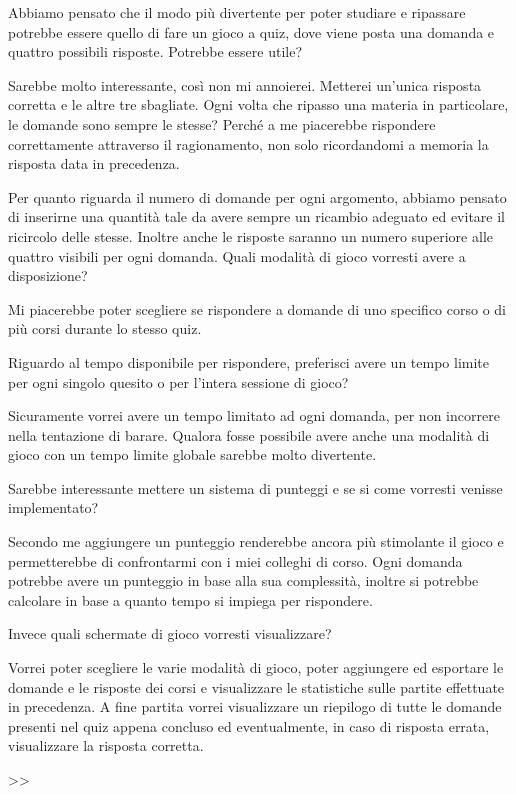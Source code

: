 {    \begin{QandA}
        \item Abbiamo pensato che il modo più divertente per poter studiare e ripassare potrebbe essere quello di fare un gioco a quiz, dove viene posta una domanda e quattro possibili risposte. Potrebbe essere utile?
            \begin{answered}
            Sarebbe molto interessante, così non mi annoierei. Metterei un'unica risposta corretta e le altre tre sbagliate. Ogni volta che ripasso una materia in particolare, le domande sono sempre le stesse? Perché a me piacerebbe rispondere correttamente attraverso il ragionamento, non solo ricordandomi a memoria la risposta data in precedenza.
            \end{answered}
        \item Per quanto riguarda il numero di domande per ogni argomento, abbiamo pensato di inserirne una quantità tale da avere sempre un ricambio adeguato ed evitare il ricircolo delle stesse. Inoltre anche le risposte saranno un numero superiore alle quattro visibili per ogni domanda.
        Quali modalità di gioco vorresti avere a disposizione?
            \begin{answered}
            Mi piacerebbe poter scegliere se rispondere a domande di uno specifico corso o di più corsi durante lo stesso quiz.
            \end{answered}
        \item Riguardo al tempo disponibile per rispondere, preferisci avere un tempo limite per ogni singolo quesito o per l'intera sessione di gioco?
            \begin{answered}
            Sicuramente vorrei avere un tempo limitato ad ogni domanda, per non incorrere nella tentazione di barare. Qualora fosse possibile avere anche una modalità di gioco con un tempo limite globale sarebbe molto divertente. 
            \end{answered}
        \item Sarebbe interessante mettere un sistema di punteggi e se si come vorresti venisse implementato?
            \begin{answered}
            Secondo me aggiungere un punteggio renderebbe ancora più stimolante il gioco e permetterebbe di confrontarmi con i miei colleghi di corso. Ogni domanda potrebbe avere un punteggio in base alla sua complessità, inoltre si potrebbe calcolare in base a quanto tempo si impiega per rispondere.
            \end{answered}
        \item Invece quali schermate di gioco vorresti visualizzare?
            \begin{answered}
            Vorrei poter scegliere le varie modalità di gioco, poter aggiungere ed esportare le domande e le risposte dei corsi e visualizzare le statistiche sulle partite effettuate in precedenza. A fine partita vorrei visualizzare un riepilogo di tutte le domande presenti nel quiz appena concluso ed eventualmente, in caso di risposta errata, visualizzare la risposta corretta.
            \end{answered}
            >>
    \end{QandA} 
}
    \newpage
    
